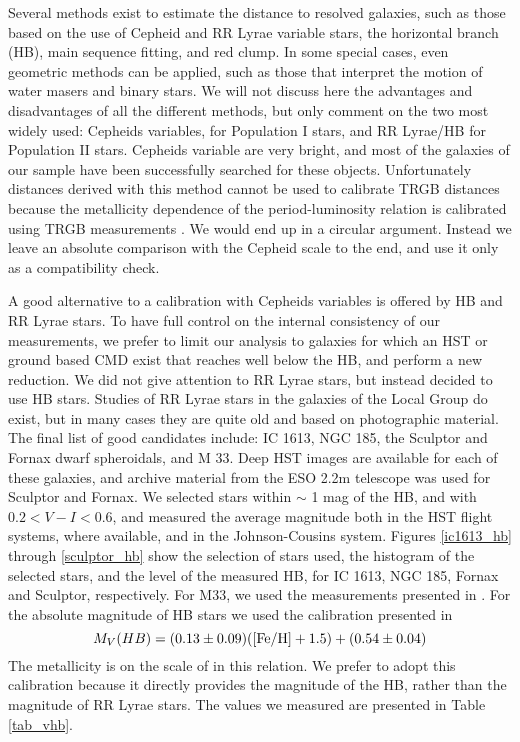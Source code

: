 \documentclass[11pt,preprint2]{aastex}
\begin{document}
Several methods exist to estimate the distance to resolved galaxies, such as those based on the use of Cepheid and RR Lyrae variable stars, the horizontal branch (HB), main sequence fitting, and red clump. In some special cases, even geometric methods can be applied, such as those that interpret the motion of water masers and binary stars. We will not discuss here the advantages and disadvantages of all the different methods, but only comment on the two most widely used: Cepheids variables, for Population I stars, and RR Lyrae/HB for Population II stars. Cepheids variable are very bright, and most of the galaxies of our sample have been successfully searched for these objects. Unfortunately distances derived with this method cannot be used to calibrate TRGB distances because the metallicity dependence of the period-luminosity relation is calibrated using TRGB measurements \citep{2004ApJ...608...42S}. We would end up in a circular argument. Instead we leave an absolute comparison with the Cepheid scale to the end, and use it only as a compatibility check.

A good alternative to a calibration with Cepheids variables is offered by HB and RR Lyrae stars. To have full control on the internal consistency of our measurements, we prefer to limit our analysis to galaxies for which an HST or ground based CMD exist that reaches well below the HB, and perform a new reduction. We did not give attention to RR Lyrae stars, but instead decided to use HB stars. Studies of RR Lyrae stars in the galaxies of the Local Group do exist, but in many cases they are quite old and based on photographic material.  The final list of good candidates include: IC 1613, NGC 185, the Sculptor and Fornax dwarf spheroidals, and M 33. Deep HST images are available for each of these galaxies, and archive material from the ESO 2.2m telescope was used for Sculptor and Fornax. 
We selected stars within $\sim$ 1 mag of the HB, and with $0.2 < V-I < 0.6$, and measured the average magnitude both in the HST flight systems, where available, and in the Johnson-Cousins system.
Figures \ref{ic1613_hb} through \ref{sculptor_hb} show the selection of stars used, the histogram of the selected stars, and the level of the measured HB, for IC 1613, NGC 185, Fornax and Sculptor, respectively. For M33, we used the measurements presented in \cite{2006AJ....132.1361S}. For the absolute magnitude of HB stars we used the calibration presented in \cite{2000ApJ...533..215C}
$$ M_V(HB) = (0.13 \pm 0.09)(\rm{[Fe/H]}+1.5) + (0.54 \pm 0.04)$$
The metallicity is on the scale of \citet{1997AAS..121...95C} in this relation.
We prefer to adopt this calibration because it directly provides the magnitude of the HB, rather than the magnitude of RR Lyrae stars.
The values we measured are presented in Table \ref{tab_vhb}.
\end{document}
